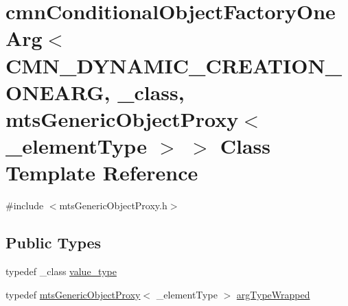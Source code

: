 \hypertarget{classcmn_conditional_object_factory_one_arg_3_01_c_m_n___d_y_n_a_m_i_c___c_r_e_a_t_i_o_n___o_n_e238fc68bde68abb82aef992b13cfbb36}{}\section{cmn\+Conditional\+Object\+Factory\+One\+Arg$<$ C\+M\+N\+\_\+\+D\+Y\+N\+A\+M\+I\+C\+\_\+\+C\+R\+E\+A\+T\+I\+O\+N\+\_\+\+O\+N\+E\+A\+R\+G, \+\_\+class, mts\+Generic\+Object\+Proxy$<$ \+\_\+element\+Type $>$ $>$ Class Template Reference}
\label{classcmn_conditional_object_factory_one_arg_3_01_c_m_n___d_y_n_a_m_i_c___c_r_e_a_t_i_o_n___o_n_e238fc68bde68abb82aef992b13cfbb36}


{\ttfamily \#include $<$mts\+Generic\+Object\+Proxy.\+h$>$}

\subsection*{Public Types}
\begin{DoxyCompactItemize}
\item 
typedef \+\_\+class \hyperlink{classcmn_conditional_object_factory_one_arg_3_01_c_m_n___d_y_n_a_m_i_c___c_r_e_a_t_i_o_n___o_n_e238fc68bde68abb82aef992b13cfbb36_a698eb0cfa7a5e42a11a97a8f4015c196}{value\+\_\+type}
\item 
typedef \hyperlink{classmts_generic_object_proxy}{mts\+Generic\+Object\+Proxy}$<$ \+\_\+element\+Type $>$ \hyperlink{classcmn_conditional_object_factory_one_arg_3_01_c_m_n___d_y_n_a_m_i_c___c_r_e_a_t_i_o_n___o_n_e238fc68bde68abb82aef992b13cfbb36_aecff2801fe164f706c71f1f6abe0e2d6}{arg\+Type\+Wrapped}
\end{DoxyCompactItemize}
